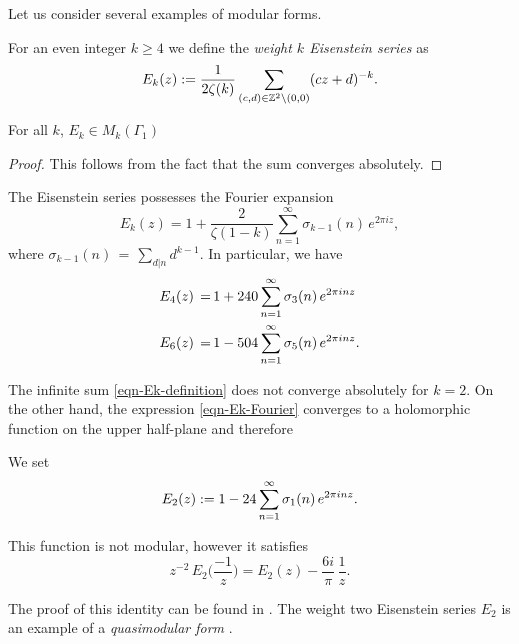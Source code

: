 Let us consider several examples of modular forms.
\begin{definition}\label{def-Ek-definition}%
For an even integer $k\geq 4$ we define the \emph{weight $k$ Eisenstein series} as
\begin{equation}\label{eqn-Ek-definition}
E_k(z):=\frac{1}{2\zeta(k)}\sum_{(c,d)\in\mathbb{Z}^2\backslash(0,0)}(cz+d)^{-k}.\end{equation}
\end{definition}
\begin{lemma}\label{lemma-Ek-is-modular-form}
    For all $k$, $E_k\in M_k(\Gamma_1)$
\end{lemma}
\begin{proof}
    This follows from the fact that the sum converges absolutely.
\end{proof}

\begin{lemma}\label{lemma-Ek-Fourier}
The Eisenstein series possesses the Fourier expansion
\begin{equation}\label{eqn-Ek-Fourier}E_k(z)=1+\frac{2}{\zeta(1-k)}\sum_{n=1}^\infty \sigma_{k-1}(n)\,e^{2\pi i z}, \end{equation}
where $\sigma_{k-1}(n)\,=\,\sum_{d|n} d^{k-1}$. In particular, we have
\begin{align}
  E_4(z)\,=\,& 1+240\sum_{n=1}^\infty \sigma_3(n)\,e^{2\pi i n z} \notag \\
  E_6(z)\,=\,& 1-504\sum_{n=1}^\infty \sigma_5(n)\,e^{2\pi i n z}. \notag
\end{align}
\end{lemma}\label{lemma-E2-not-abs-conv}
The infinite sum \eqref{eqn-Ek-definition} does not converge absolutely for $k=2$. On the other hand, the expression \eqref{eqn-Ek-Fourier} converges to a holomorphic function on the upper half-plane and therefore
\begin{definition}\label{def-E2} %
We set
\begin{equation}E_2(z):= 1-24\sum_{n=1}^\infty \sigma_1(n)\,e^{2\pi i n z}.\notag\end{equation}
\end{definition}
\begin{lemma}\label{lemma-E2-transform}
This function is not modular, however it satisfies
\begin{equation}\label{eqn-E2-transform}z^{-2}\,E_2\Big(\frac{-1}{z}\Big)=E_2(z) -\frac{6i}{\pi}\, \frac{1}{z}.\end{equation}
\end{lemma}
The proof of this identity can be found in \cite[Section~2.3]{1-2-3}.
The weight two Eisenstein series $E_2$ is an example of a \emph{quasimodular form} \cite[Section~5.1]{1-2-3}.

